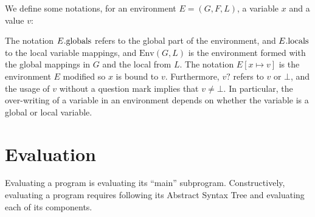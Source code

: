 \documentclass{book}
\begin{document}
We define some notations, for an environment $E = (G, F, L)$, a variable $x$
and a value $v$:
%
%
The notation $E.\text{globals}$ refers to the global part of the environment, and
$E.\text{locals}$ to the local variable mappings, and $\text{Env} (G, L)$ is the
environment formed with the global mappings in $G$ and the local from $L$.
%
The notation $E[x \mapsto v]$ is the environment $E$ modified so $x$ is bound
to $v$.
%
Furthermore, $v?$ refers to $v$ or $\bot$, and the usage of $v$ without a
question mark implies that $v \neq \bot$.
%
In particular, the over-writing of a variable in an environment depends on
whether the variable is a global or local variable.

\section{Evaluation}

Evaluating a program is evaluating its ``main'' subprogram.
Constructively, evaluating a program requires following its
Abstract Syntax Tree and evaluating each of its components.
\end{document}
